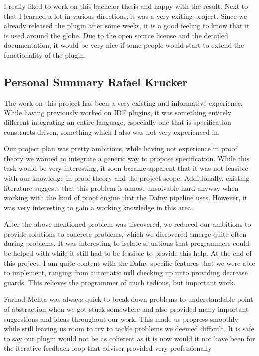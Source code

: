 I really liked to work on this bachelor thesis and happy with the result. Next to that I learned a lot in various directions, it was a very exiting project. Since we already released the plugin after some weeks, it is a good feeling to know that it is used around the globe. Due to the open source license and the detailed documentation, it would be very nice if some people would start to extend the functionality of the plugin.   \newline


\subsection{Personal Summary Rafael Krucker}
The work on this project has been a very existing and informative experience. While having previously worked on IDE plugins, it was something entirely different integrating an entire language, especially one that is specification constructs driven, something which I also was not very experienced in. \newline

Our project plan was pretty ambitious, while having not experience in proof theory we wanted to integrate a generic way to propose specification. While this task would be very interesting, it soon became apparent that it was not feasible with our knowledge in proof theory and the project scope. Additionally, existing literature suggests that this problem is almost unsolvable hard anyway when working with the kind of proof engine that the Dafny pipeline uses. However, it was very interesting to gain a working knowledge in this area. \newline

After the above mentioned problem was discovered, we reduced our ambitions to provide solutions to concrete problems, which we discovered emerge quite often during problems. It was interesting to isolate situations that programmers could be helped with while it still had to be feasible to provide this help. At the end of this project, I am quite content with the Dafny specific features that we were able to implement, ranging from automatic null checking up unto providing decrease guards. This relieves the programmer of much tedious, but important work. \newline

Farhad Mehta was always quick to break down problems to understandable point of abstraction when we got stuck somewhere and also provided many important suggestions and ideas throughout our work. This made us progress smoothly while still leaving us room to try to tackle problems we deemed difficult. It is safe to say our plugin would not be as coherent as it is now would it not have been for the iterative feedback loop that adviser provided very professionally \newline

